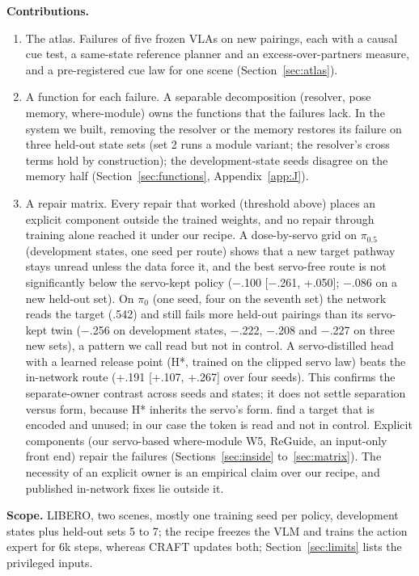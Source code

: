 \documentclass{article}
\newcommand{\mi}{$-$}
\newcommand{\pifive}{$\pi_{0.5}$}
\newcommand{\pizero}{$\pi_0$}
\begin{document}
\textbf{Contributions.}
\begin{enumerate}
\item The atlas. Failures of five frozen VLAs on new pairings, each with a causal cue test, a same-state reference planner and an excess-over-partners measure, and a pre-registered cue law for one scene (Section~\ref{sec:atlas}).
\item A function for each failure. A separable decomposition (resolver, pose memory, where-module) owns the functions that the failures lack. In the system we built, removing the resolver or the memory restores its failure on three held-out state sets (set 2 runs a module variant; the resolver's cross terms hold by construction); the development-state seeds disagree on the memory half (Section~\ref{sec:functions}, Appendix~\ref{app:J}).
\item A repair matrix. Every repair that worked (threshold above) places an explicit component outside the trained weights, and no repair through training alone reached it under our recipe. A dose-by-servo grid on \pifive{} (development states, one seed per route) shows that a new target pathway stays unread unless the data force it, and the best servo-free route is not significantly below the servo-kept policy (\mi.100 [\mi.261, +.050]; \mi.086 on a new held-out set). On \pizero{} (one seed, four on the seventh set) the network reads the target (.542) and still fails more held-out pairings than its servo-kept twin (\mi.256 on development states, \mi.222, \mi.208 and \mi.227 on three new sets), a pattern we call read but not in control. A servo-distilled head with a learned release point (H*, trained on the clipped servo law) beats the in-network route (+.191 [+.107, +.267] over four seeds). This confirms the separate-owner contrast across seeds and states; it does not settle separation versus form, because H* inherits the servo's form. \citet{jiang2610} find a target that is encoded and unused; in our case the token is read and not in control. Explicit components (our servo-based where-module W5, ReGuide, an input-only front end) repair the failures (Sections~\ref{sec:inside} to~\ref{sec:matrix}). The necessity of an explicit owner is an empirical claim over our recipe, and published in-network fixes lie outside it.
\end{enumerate}

\textbf{Scope.} LIBERO, two scenes, mostly one training seed per policy, development states plus held-out sets 5 to 7; the recipe freezes the VLM and trains the action expert for 6k steps, whereas CRAFT updates both; Section~\ref{sec:limits} lists the privileged inputs.
\end{document}
